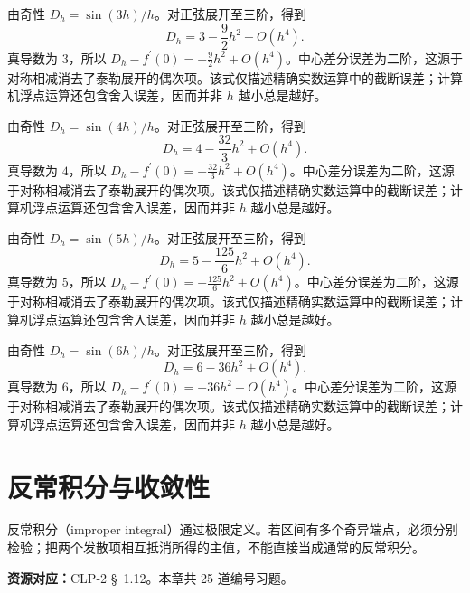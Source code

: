 \documentclass[12pt,fontset=fandol]{ctexart}
\begin{document}
\begin{solve}\label{ans:c18q21}
由奇性 $D_h=\sin(3h)/h$。对正弦展开至三阶，得到
\[
D_h=3-\frac{9}{2}h^2+O(h^4).
\]
真导数为 $3$，所以 $D_h-f^{\prime}(0)=-\frac{9}{2}h^2+O(h^4)$。中心差分误差为二阶，这源于对称相减消去了泰勒展开的偶次项。该式仅描述精确实数运算中的截断误差；计算机浮点运算还包含舍入误差，因而并非 $h$ 越小总是越好。
\end{solve}

\begin{solve}\label{ans:c18q22}
由奇性 $D_h=\sin(4h)/h$。对正弦展开至三阶，得到
\[
D_h=4-\frac{32}{3}h^2+O(h^4).
\]
真导数为 $4$，所以 $D_h-f^{\prime}(0)=-\frac{32}{3}h^2+O(h^4)$。中心差分误差为二阶，这源于对称相减消去了泰勒展开的偶次项。该式仅描述精确实数运算中的截断误差；计算机浮点运算还包含舍入误差，因而并非 $h$ 越小总是越好。
\end{solve}

\begin{solve}\label{ans:c18q23}
由奇性 $D_h=\sin(5h)/h$。对正弦展开至三阶，得到
\[
D_h=5-\frac{125}{6}h^2+O(h^4).
\]
真导数为 $5$，所以 $D_h-f^{\prime}(0)=-\frac{125}{6}h^2+O(h^4)$。中心差分误差为二阶，这源于对称相减消去了泰勒展开的偶次项。该式仅描述精确实数运算中的截断误差；计算机浮点运算还包含舍入误差，因而并非 $h$ 越小总是越好。
\end{solve}

\begin{solve}\label{ans:c18q24}
由奇性 $D_h=\sin(6h)/h$。对正弦展开至三阶，得到
\[
D_h=6-36h^2+O(h^4).
\]
真导数为 $6$，所以 $D_h-f^{\prime}(0)=-36h^2+O(h^4)$。中心差分误差为二阶，这源于对称相减消去了泰勒展开的偶次项。该式仅描述精确实数运算中的截断误差；计算机浮点运算还包含舍入误差，因而并非 $h$ 越小总是越好。
\end{solve}

\clearpage
\section{反常积分与收敛性}\label{sec:ch19}
反常积分（improper integral）通过极限定义。若区间有多个奇异端点，必须分别检验；把两个发散项相互抵消所得的主值，不能直接当成通常的反常积分。

\textbf{资源对应：}CLP-2 \S~1.12。本章共 25 道编号习题。
\end{document}

